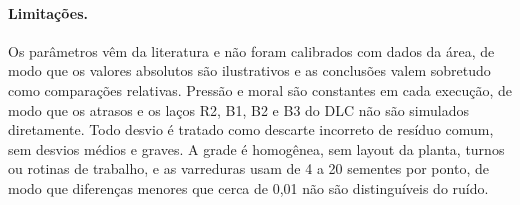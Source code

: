 \documentclass[11pt, a4paper]{article}
\begin{document}
\paragraph{Limitações.}
Os parâmetros vêm da literatura e não foram calibrados com dados da área, de modo que os valores absolutos são ilustrativos e as conclusões valem sobretudo como comparações relativas. Pressão e moral são constantes em cada execução, de modo que os atrasos e os laços R2, B1, B2 e B3 do DLC não são simulados diretamente. Todo desvio é tratado como descarte incorreto de resíduo comum, sem desvios médios e graves. A grade é homogênea, sem layout da planta, turnos ou rotinas de trabalho, e as varreduras usam de 4 a 20 sementes por ponto, de modo que diferenças menores que cerca de 0,01 não são distinguíveis do ruído.

{\footnotesize
\setlength{\bibsep}{2pt}


}
\end{document}
